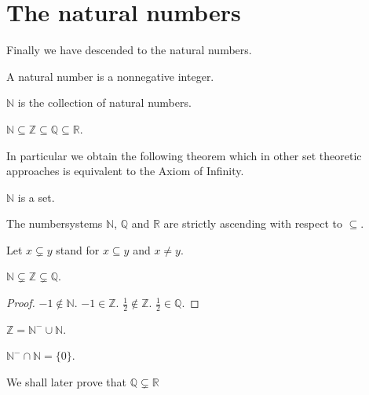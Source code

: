 \documentclass{article}
\begin{document}
\section{The natural numbers}

Finally we have descended to the natural numbers.

\begin{forthel}

\begin{definition}
A natural number is a nonnegative integer.
\end{definition}

\begin{definition}
$\mathbb{N}$ is the collection
of natural numbers.
\end{definition}

\begin{lemma}
$\mathbb{N} \subseteq \mathbb{Z} \subseteq 
\mathbb{Q} \subseteq \mathbb{R}$.
\end{lemma}
\end{forthel}
%
In particular we obtain the following theorem which
in other set theoretic approaches is equivalent to 
the Axiom of Infinity.
%
\begin{forthel}
\begin{theorem}
$\mathbb{N}$ is a set.
\end{theorem}
\end{forthel}
%
The numbersystems $\mathbb{N}$, $\mathbb{Q}$ and $\mathbb{R}$
are strictly ascending with respect to $\subseteq$.
%
\begin{forthel}
Let $x \subsetneq y$ stand for $x \subseteq y$ and $x \neq y$.

\begin{theorem}
$\mathbb{N} \subsetneq \mathbb{Z} \subsetneq 
\mathbb{Q}$.
\end{theorem}
\begin{proof}
$-1 \notin \mathbb{N}$. $-1 \in \mathbb{Z}$.
$\frac{1}{2} \notin \mathbb{Z}$. 
$\frac{1}{2} \in \mathbb{Q}$.
\end{proof}

\begin{lemma}
$\mathbb{Z} = \mathbb{N}^- \cup \mathbb{N}$.
\end{lemma}

\begin{lemma}
$\mathbb{N}^- \cap \mathbb{N} = \{0\}$.
\end{lemma}
\end{forthel}
We shall later prove that $\mathbb{Q} \subsetneq \mathbb{R}$ 
\end{document}
